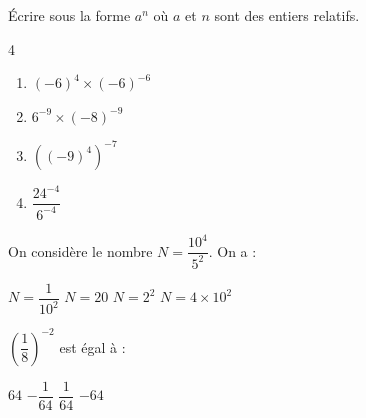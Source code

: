 \documentclass[a4paper,11pt,fleqn]{article}
\begin{document}
\begin{EXO}{}{}

Écrire sous la forme $a^n$ où $a$ et $n$  sont  des  entiers relatifs. 
\begin{multicols}{4}
\begin{enumerate}
	\item \begin{minipage}[t]{\linewidth} 

$(-6)^{4}\times (-6)^{-6}$ \end{minipage}
	\item \begin{minipage}[t]{\linewidth} 

$6^{-9}\times (-8)^{-9}$ \end{minipage}
	\item \begin{minipage}[t]{\linewidth} 

 $\left((-9)^{4}\right)^{-7}$ \end{minipage}
	\item \begin{minipage}[t]{\linewidth} 

 $\dfrac{24^{-4}}{6^{-4}}$ \end{minipage}
\end{enumerate}
\end{multicols}
\end{EXO}

\begin{EXO}{}{}



 On considère le nombre $N=\dfrac{10^4}{5^2}$. On a :\medskip

\begin{qcmprop}[cols=4]
  \task $N=\dfrac{1}{10^{2}}$
  \task $N=20$
  \task $N=2^{2}$
  \task  $N=4\times 10^{2}$
\end{qcmprop}

\end{EXO}

\begin{EXO}{}{}



 $\left(\dfrac{1}{8}\right)^{-2}$ est égal à : \medskip

\begin{qcmprop}[cols=4]
  \task $64$
  \task $-\dfrac{1}{64}$
  \task $\dfrac{1}{64}$
  \task $-64$
\end{qcmprop}

\end{EXO}
\end{document}
